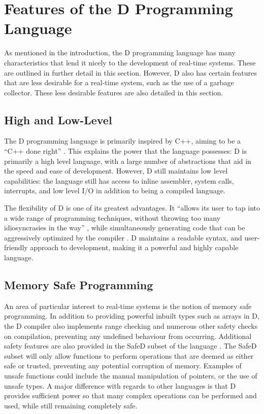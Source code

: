 

\section{Features of the D Programming Language}
As mentioned in the introduction, the D programming language has many 
characteristics that lend it nicely to the development of real-time systems.
These are outlined in further detail in this section. 
However, D also has certain features that are less desirable for a real-time 
system, such as the use of a garbage collector. These less desirable features 
are also detailed in this section.

\subsection{High and Low-Level}
The D programming language is primarily inspired by C++, aiming to be a ``C++ done
right'' 
\cite{qznc-tutorial}. This explains the 
power that the language possesses: D is primarily a high level language, with
a large number of abstractions that aid in the speed and ease of development. 
However, D still maintains low level capabilities: the language still has access 
to inline assembler, system calls, interrupts, and low level I/O in addition to 
being a compiled language.
\par\bigskip\noindent
The flexibility of D is one of its greatest advantages. It ``allows its user to tap 
into a wide range of programming techniques, without throwing too many 
idiosyncrasies in the way''
\cite{ddili-book}, 
while simultaneously generating code that can be aggressively optimized by the
compiler 
\cite{dlang-overview}. D maintains a readable syntax, and 
user-friendly approach to development, making it a powerful and highly capable 
language.

\subsection{Memory Safe Programming}
An area of particular interest to real-time systems is the notion of memory 
safe programming. In addition to providing powerful inbuilt types such as arrays 
in D, the D compiler also implements range checking and numerous other 
safety checks on compilation, preventing any undefined behaviour from occurring.
Additional safety features are also provided in the SafeD subset of the language
\cite{safe-d}. The SafeD subset will only allow functions to perform 
operations that are deemed as either safe or trusted, preventing any 
potential corruption of memory. Examples of unsafe functions could include the 
manual manipulation of pointers, or the use of unsafe types. A major difference 
with regards to other languages is that D provides sufficient power so that many complex 
operations can be performed and used, while still remaining completely safe.

